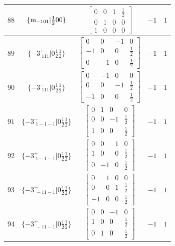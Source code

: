 \documentclass[fleqn,8pt]{jsarticle}
\begin{document}
\begin{longtable}{ccccc}
$ 88 $ & $ \{{\rm m}_{-101}|\frac{1}{2} 0 0\} $ & $ \begin{bmatrix} 0 & 0 & 1 & \frac{1}{2} \\ 0 & 1 & 0 & 0 \\ 1 & 0 & 0 & 0 \end{bmatrix} $ & $ -1 $ & $ 1 $ \\ \hline
$ 89 $ & $ \{-3^{+}_{\,\,111}|0 \frac{1}{2} \frac{1}{2}\} $ & $ \begin{bmatrix} 0 & 0 & -1 & 0 \\ -1 & 0 & 0 & \frac{1}{2} \\ 0 & -1 & 0 & \frac{1}{2} \end{bmatrix} $ & $ -1 $ & $ 1 $ \\ \hline
$ 90 $ & $ \{-3^{-}_{\,\,111}|0 \frac{1}{2} \frac{1}{2}\} $ & $ \begin{bmatrix} 0 & -1 & 0 & 0 \\ 0 & 0 & -1 & \frac{1}{2} \\ -1 & 0 & 0 & \frac{1}{2} \end{bmatrix} $ & $ -1 $ & $ 1 $ \\ \hline
$ 91 $ & $ \{-3^{-}_{\,\,1-1-1}|0 \frac{1}{2} \frac{1}{2}\} $ & $ \begin{bmatrix} 0 & 1 & 0 & 0 \\ 0 & 0 & -1 & \frac{1}{2} \\ 1 & 0 & 0 & \frac{1}{2} \end{bmatrix} $ & $ -1 $ & $ 1 $ \\ \hline
$ 92 $ & $ \{-3^{+}_{\,\,1-1-1}|0 \frac{1}{2} \frac{1}{2}\} $ & $ \begin{bmatrix} 0 & 0 & 1 & 0 \\ 1 & 0 & 0 & \frac{1}{2} \\ 0 & -1 & 0 & \frac{1}{2} \end{bmatrix} $ & $ -1 $ & $ 1 $ \\ \hline
$ 93 $ & $ \{-3^{-}_{\,\,-11-1}|0 \frac{1}{2} \frac{1}{2}\} $ & $ \begin{bmatrix} 0 & 1 & 0 & 0 \\ 0 & 0 & 1 & \frac{1}{2} \\ -1 & 0 & 0 & \frac{1}{2} \end{bmatrix} $ & $ -1 $ & $ 1 $ \\ \hline
$ 94 $ & $ \{-3^{+}_{\,\,-11-1}|0 \frac{1}{2} \frac{1}{2}\} $ & $ \begin{bmatrix} 0 & 0 & -1 & 0 \\ 1 & 0 & 0 & \frac{1}{2} \\ 0 & 1 & 0 & \frac{1}{2} \end{bmatrix} $ & $ -1 $ & $ 1 $ \\ \hline

\end{longtable}
\end{document}
